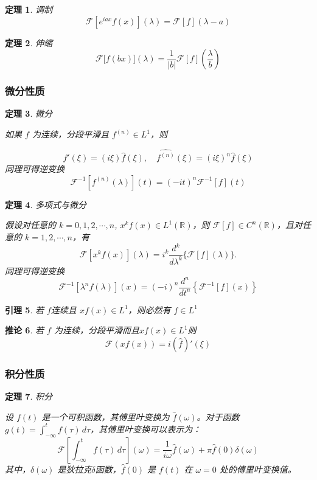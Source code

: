 \documentclass[12pt,a4paper]{article}
\theoremstyle{plain}
\newtheorem{theorem}{定理}[section]
\newtheorem{lemma}[theorem]{引理}
\newtheorem{corollary}[theorem]{推论}  %
\theoremstyle{definition}
\theoremstyle{remark}
\begin{document}
 \begin{theorem}调制
 \[
 \mathcal{F}\left[e^{iax}f(x)\right](\lambda) = \mathcal{F}[f](\lambda - a)
 \]
\end{theorem}

\begin{theorem}伸缩
	\[
\mathcal{F}\big[f(bx)\big](\lambda) = \frac{1}{|b|} \mathcal{F}[f]\left( \frac{\lambda}{b} \right)
\]
\end{theorem}

 \subsubsection{微分性质}
 \begin{theorem}微分
 	
 如果 \( f \) 为连续，分段平滑且 \( f^{(n)} \in L^1 \)，则
 
 \[
 \widehat{f'}(\xi) = (i\xi) \widehat{f}(\xi), \quad \widehat{f^{(n)}}(\xi) = (i\xi)^n \widehat{f}(\xi)
 \]
 同理可得逆变换
 \[
 \mathcal{F}^{-1}[f^{(n)}(\lambda)](t) = (-it)^n \mathcal{F}^{-1}[f](t)
 \]
\end{theorem}

\begin{theorem}多项式与微分
	
	假设对任意的 \( k = 0, 1, 2, \cdots, n \), \( x^k f(x) \in L^1(\mathbb{R}) \)，则 \( \mathcal{F}[f] \in C^n(\mathbb{R}) \)，且对任意的 \( k = 1, 2, \cdots, n \)，有
	\[
	\mathcal{F}\left[x^k f(x)\right](\lambda) = i^k \frac{d^k}{d\lambda^k} \{\mathcal{F}[f](\lambda)\}.
	\]
同理可得逆变换
\[
\mathcal{F}^{-1}[\lambda^n f(\lambda)](x) = (-i)^n \frac{d^n}{dt^n} \left\{ \mathcal{F}^{-1}[f](x) \right\}
\]
\end{theorem}

\begin{lemma}
若 \( f \)连续且 \( xf(x) \in L^1 \)，则必然有 \( f \in L^1 \)

\end{lemma}

\begin{corollary}
若 \( f \) 为连续，分段平滑而且\( xf(x)  \in L^1\)则
\[
\mathcal{F}(xf(x)) = i (\widehat{f})'(\xi)
\]
  \end{corollary}







 \subsubsection{积分性质}
 \begin{theorem}积分
 	
 设 \( f(t) \) 是一个可积函数，其傅里叶变换为 \( \hat{f}(\omega) \)。对于函数 \( g(t) = \int_{-\infty}^{t} f(\tau) \, d\tau \)，其傅里叶变换可以表示为：
 \[
 \mathcal{F}\left[\int_{-\infty}^{t} f(\tau) \, d\tau\right](\omega) = \frac{1}{i\omega} \hat{f}(\omega) + \pi \hat{f}(0) \delta(\omega)
 \]
 其中，\( \delta(\omega) \) 是狄拉克$\delta$函数，\( \hat{f}(0) \) 是 \( f(t) \) 在 \( \omega = 0 \) 处的傅里叶变换值。
 \end{theorem}
 
\end{document}

